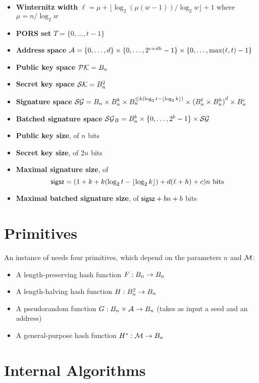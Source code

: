 \begin{itemize}
\item \textbf{Winternitz width} $\ell = \mu + \lfloor \log_2{(\mu(w-1))} / \log_2{w} \rfloor + 1$ where $\mu = n / \log_2{w}$
\item \textbf{PORS set} $T = \{0, \ldots, t-1\}$
\item \textbf{Address space} $\mathcal{A} = \{0, \ldots, d\} \times \{0, \ldots, 2^{c+dh}-1\} \times \{0, \ldots, \max(\ell, t)-1\}$
\item \textbf{Public key space} $\mathcal{PK} = B_n$
\item \textbf{Secret key space} $\mathcal{SK} = B_n^2$
\item \textbf{Signature space} $\mathcal{SG} = B_n \times B_n^k \times B_n^{\le k(\log_2{t} - \lfloor \log_2{k} \rfloor)} \times {(B_n^\ell \times B_n^h)}^d \times B_n^c$
\item \textbf{Batched signature space} $\mathcal{SG}_B = B_n^b \times \{0, \ldots, 2^b-1\} \times \mathcal{SG}$
\item \textbf{Public key size}, of $n$ bits
\item \textbf{Secret key size}, of $2n$ bits
\item \textbf{Maximal signature size}, of\[\textsf{sigsz} = (1 + k + k(\log_2{t} - \lfloor \log_2{k} \rfloor) + d(\ell+h) + c)n \text{ bits}\]
\item \textbf{Maximal batched signature size}, of $\textsf{sigsz} + bn + b$ bits
\end{itemize}
%


\section{Primitives}

An instance of \gravity{} needs four primitives, which depend on the parameters $n$ and $\mathcal{M}$:
\begin{itemize}
\item A length-preserving hash function $F : B_n \to B_n$
\item A length-halving hash function $H : B_n^2 \to B_n$
\item A pseudorandom function $G : B_n \times \mathcal{A} \to B_n$ (takes as input a seed and an address)
\item A general-purpose hash function $H^* : \mathcal{M} \to B_n$
\end{itemize}


\section{Internal Algorithms}

